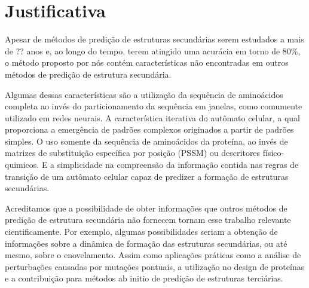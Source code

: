 \chapter{Justificativa}

Apesar de métodos de predição de estruturas secundárias serem estudados a mais de ?? anos e, ao longo do tempo, terem atingido uma acurácia em torno de 80\%, o método proposto por nós contém características não encontradas em outros métodos de predição de estrutura secundária.

Algumas dessas características são a utilização da sequência de aminoácidos completa ao invés do particionamento da sequência em janelas, como comumente utilizado em redes neurais. A característica iterativa do autômato celular, a qual proporciona a emergência de padrões complexos originados a partir de padrões simples. O uso somente da sequência de aminoácidos da proteína, ao invés de matrizes de substituição específica por posição (PSSM) ou descritores físico-quimicos. E a simplicidade na compreensão da informação contida nas regras de transição de um autômato celular capaz de predizer a formação de estruturas secundárias. 

Acreditamos que a possibilidade de obter informações que outros métodos de predição de estrutura secundária não fornecem tornam esse trabalho relevante cientificamente. Por exemplo, algumas possibilidades seriam a obtenção de informações sobre a dinâmica de formação das estruturas secundárias, ou até mesmo, sobre o enovelamento. Assim como aplicações práticas como a análise de perturbações causadas por mutações pontuais, a utilização no design de proteínas e a contribuição para métodos ab initio de predição de estruturas terciárias.


